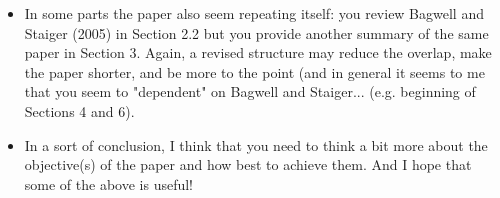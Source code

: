 \documentclass[12pt]{article}
\begin{document}
\begin{itemize}
	\item In some parts the paper also seem repeating itself: you review Bagwell and Staiger (2005) in Section 2.2 but you provide another summary of the same paper in Section 3. Again, a revised structure may reduce the overlap, make the paper shorter, and be more to the point (and in general it seems to me that you seem to "dependent" on Bagwell and Staiger... (e.g. beginning of Sections 4 and 6).
	\item In a sort of conclusion, I think that you need to think a bit more about the objective(s) of the paper and how best to achieve them. And I hope that some of the above is useful!
\end{itemize}
\end{document}
